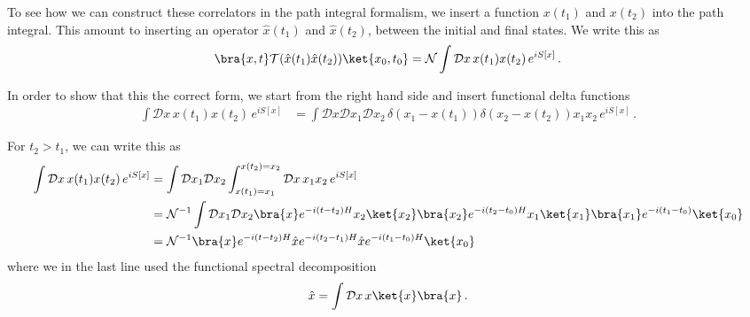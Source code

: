 To see how we can construct these correlators in the path integral formalism, we insert a function $x(t_1)$ and $x(t_2)$ into the path integral. This amount to inserting an operator $\hat{x}(t_1)$ and $\hat{x}(t_2)$, between the initial and final states. We write this as
\begin{align}\label{eq:time ordered product as path integral}
    \bra{x,t}\mathcal{T}(\hat{x}(t_1)\hat{x}(t_2))\ket{x_0,t_0}=\mathcal{N}\int\mathcal{D}x \,x(t_1)x(t_2)\,e^{iS[x]}\,.
\end{align}

In order to show that this the correct form, we start from the right hand side and insert functional delta functions
\begin{align}
    \int\mathcal{D}x \,x(t_1)x(t_2)\,e^{iS[x]}&=\int\mathcal{D}x\mathcal{D}x_1\mathcal{D}x_2\,\delta(x_1-x(t_1))\delta(x_2-x(t_2))x_1x_2\,e^{iS[x]}\,.
\end{align}

For $t_2>t_1$, we can write this as
\begin{align}
    \int\mathcal{D}x \,x(t_1)x(t_2)\,e^{iS[x]}&=\int\mathcal{D}x_1\mathcal{D}x_2\int_{x(t_1)=x_1}^{x(t_2)=x_2}\mathcal{D}x\,x_1x_2\,e^{iS[x]}\nonumber
    \\
    &=\mathcal{N}^{-1}\int\mathcal{D}x_1\mathcal{D}x_2\bra{x}e^{-i(t-t_2)H}x_2\ket{x_2}\bra{x_2}e^{-i(t_2-t_0)H}x_1\ket{x_1}\bra{x_1}e^{-i(t_1-t_0)}\ket{x_0}\nonumber
    \\
    &=\mathcal{N}^{-1}\bra{x}e^{-i(t-t_2)H}\hat{x}e^{-i(t_2-t_1)H}\hat{x}e^{-i(t_1-t_0)H}\ket{x_0}
\end{align}
where we in the last line used the functional spectral decomposition
\begin{align}
    \hat{x}=\int\mathcal{D}x\,x\ket{x}\bra{x}\,.
\end{align}

